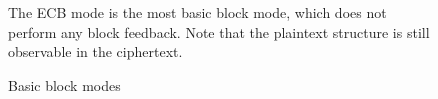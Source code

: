 \begin{figure}
\begin{minipage}{0.8\textwidth}
    \bigskip
  \end{minipage}

  \begin{footnotesize}
    The ECB mode is the most basic block mode, which does not perform any block feedback. Note that the plaintext structure is still observable in the ciphertext.
  \end{footnotesize}

  \caption{Basic block modes}
  \label{figure/block-modes}
\end{figure}
